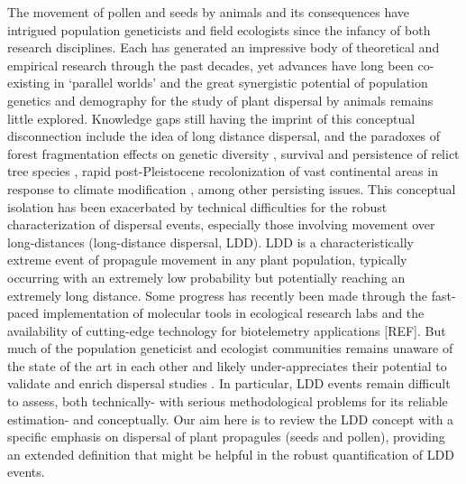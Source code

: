 \documentclass[a4paper, 12pt]{article}
\begin{document}
\begin{linenumbers}
The movement of pollen and seeds by animals and its consequences have intrigued population geneticists and field ecologists since the infancy of both research disciplines. Each has generated an impressive body of theoretical and empirical research through the past decades, yet advances have long been co-existing in ‘parallel worlds’ and the great synergistic potential of population genetics and demography for the study of plant dispersal by animals remains little explored. Knowledge gaps still having the imprint of this conceptual disconnection include the idea of long distance dispersal, and the paradoxes of forest fragmentation effects on genetic diversity \citep{Kramer:2008kg}, survival and persistence of relict tree species \citep{Hampe:2011bv}, rapid post-Pleistocene recolonization of vast continental areas in response to climate modification \citep{Clark:1998aa,Clark:1998vi}, among other persisting issues. This conceptual isolation has been exacerbated by technical difficulties for the robust characterization of dispersal events, especially those involving movement over long-distances (long-distance dispersal, LDD). LDD is a characteristically extreme event of propagule movement in any plant population, typically occurring with an extremely low probability but potentially reaching an extremely long distance. Some progress has recently been made through the fast-paced implementation of molecular tools in ecological research labs and the availability of cutting-edge technology for biotelemetry applications [REF]. But much of the population geneticist and ecologist communities remains unaware of the state of the art in each other and likely under-appreciates their potential to validate and enrich dispersal studies \citep{Jones:2008il}. In particular, LDD events remain difficult to assess, both technically- with serious methodological problems for its reliable estimation- and conceptually. Our aim here is to review the LDD concept with a specific emphasis on dispersal of plant propagules (seeds and pollen), providing an extended definition that might be helpful in the robust quantification of LDD events.   


\end{linenumbers}
\end{document}
